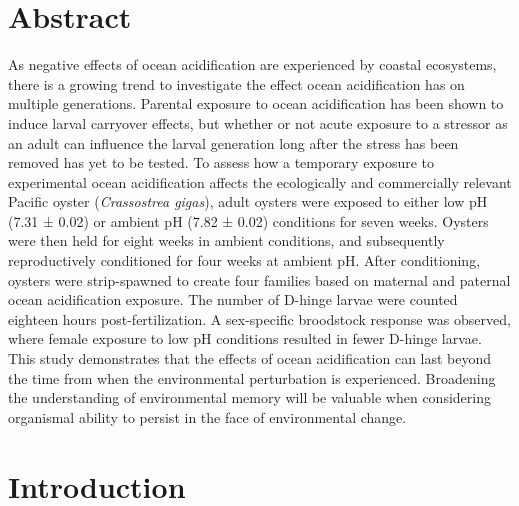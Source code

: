 \documentclass [11pt, proquest] {uwthesis}[2015/03/03]
\begin{document}
\hypertarget{abstract-1}{%
\section{Abstract}\label{abstract-1}}

As negative effects of ocean acidification are experienced by coastal ecosystems, there is a growing trend to investigate the effect ocean acidification has on multiple generations. Parental exposure to ocean acidification has been shown to induce larval carryover effects, but whether or not acute exposure to a stressor as an adult can influence the larval generation long after the stress has been removed has yet to be tested. To assess how a temporary exposure to experimental ocean acidification affects the ecologically and commercially relevant Pacific oyster (\emph{Crassostrea gigas}), adult oysters were exposed to either low pH (7.31 ± 0.02) or ambient pH (7.82 ± 0.02) conditions for seven weeks. Oysters were then held for eight weeks in ambient conditions, and subsequently reproductively conditioned for four weeks at ambient pH. After conditioning, oysters were strip-spawned to create four families based on maternal and paternal ocean acidification exposure. The number of D-hinge larvae were counted eighteen hours post-fertilization. A sex-specific broodstock response was observed, where female exposure to low pH conditions resulted in fewer D-hinge larvae. This study demonstrates that the effects of ocean acidification can last beyond the time from when the environmental perturbation is experienced. Broadening the understanding of environmental memory will be valuable when considering organismal ability to persist in the face of environmental change.

\hypertarget{introduction-2}{%
\section{Introduction}\label{introduction-2}}
\end{document}

